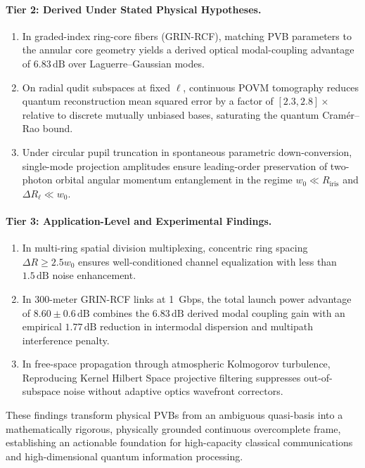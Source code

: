 \documentclass[11pt,a4paper]{article}
\begin{document}
\paragraph{Tier 2: Derived Under Stated Physical Hypotheses.}
\begin{enumerate}
    \item In graded-index ring-core fibers (GRIN-RCF), matching PVB parameters to the annular core geometry yields a derived optical modal-coupling advantage of $6.83\,\text{dB}$ over Laguerre--Gaussian modes.
    \item On radial qudit subspaces at fixed $\ell$, continuous POVM tomography reduces quantum reconstruction mean squared error by a factor of $[2.3, 2.8]\times$ relative to discrete mutually unbiased bases, saturating the quantum Cramér--Rao bound.
    \item Under circular pupil truncation in spontaneous parametric down-conversion, single-mode projection amplitudes ensure leading-order preservation of two-photon orbital angular momentum entanglement in the regime $w_0 \ll R_{\text{iris}}$ and $\Delta R_\ell \ll w_0$.
\end{enumerate}

\paragraph{Tier 3: Application-Level and Experimental Findings.}
\begin{enumerate}
    \item In multi-ring spatial division multiplexing, concentric ring spacing $\Delta R \ge 2.5 w_0$ ensures well-conditioned channel equalization with less than $1.5\,\text{dB}$ noise enhancement.
    \item In 300-meter GRIN-RCF links at 1~Gbps, the total launch power advantage of $8.60 \pm 0.6\,\text{dB}$ combines the $6.83\,\text{dB}$ derived modal coupling gain with an empirical $1.77\,\text{dB}$ reduction in intermodal dispersion and multipath interference penalty.
    \item In free-space propagation through atmospheric Kolmogorov turbulence, Reproducing Kernel Hilbert Space projective filtering suppresses out-of-subspace noise without adaptive optics wavefront correctors.
\end{enumerate}

These findings transform physical PVBs from an ambiguous quasi-basis into a mathematically rigorous, physically grounded continuous overcomplete frame, establishing an actionable foundation for high-capacity classical communications and high-dimensional quantum information processing.
\end{document}
